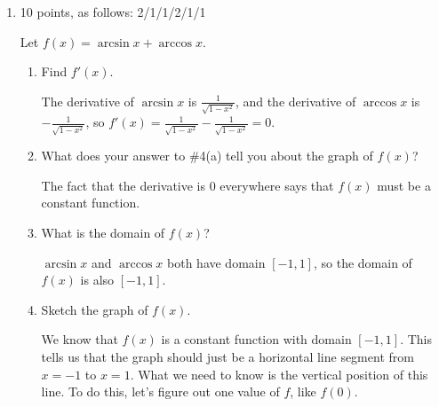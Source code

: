 \documentclass{article}
\begin{document}
\begin{enumerate}
\begin{enumerate}
    \end{enumerate}

\item 

\begin{grading}
    10 points, as follows: 2/1/1/2/1/1
\end{grading}

Let $f(x) = \arcsin x + \arccos x$.
  \begin{enumerate}
  \item
\begin{problem}[\vfill]
      Find $f'(x)$.
    \end{problem}

    \begin{solution}
      The derivative of $\arcsin x$ is $\frac{1}{\sqrt{1 - x^2}}$, and the
      derivative of $\arccos x$ is $-\frac{1}{\sqrt{1 - x^2}}$, so $f'(x)
      = \frac{1}{\sqrt{1 - x^2}} - \frac{1}{\sqrt{1 - x^2}} = \boxed{0}$. 
    \end{solution}

  \item
    \begin{problem}[\vfill]
      What does your answer to {{{{\#4}}(a)}} tell
      you about the graph of $f(x)$?
    \end{problem}

    \begin{solution}
      The fact that the derivative is 0 everywhere says that $f(x)$ must
      be a constant function.
    \end{solution}

  \item
    \begin{problem}[\vfill]
      What is the domain of $f(x)$?
    \end{problem}

    \begin{solution}
      $\arcsin x$ and $\arccos x$ both have domain $[-1, 1]$, so the
      domain of $f(x)$ is also $[-1, 1]$. 
    \end{solution}

  \item
    \begin{problem}[\stretch{2}]
      Sketch the graph of $f(x)$.
    \end{problem}

    \begin{solution}
      We know that $f(x)$ is a constant function with domain $[-1, 1]$.
      This tells us that the graph should just be a horizontal line
      segment from $x = -1$ to $x = 1$.  What we need to know is the
      vertical position of this line.  To do this, let's figure out one
      value of $f$, like $f(0)$.


\end{solution}
\end{enumerate}
\end{enumerate}
\end{document}
